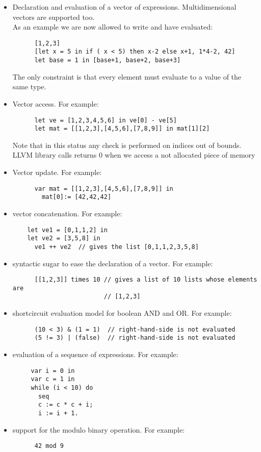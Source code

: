 \documentclass[11pt]{article}
\begin{document}
\begin{itemize}

  \item Declaration and evaluation of a vector of expressions. Multidimensional vectors are supported too.\\
  As an example we are now allowed to write and have evaluated:
  \begin{verbatim}
      [1,2,3]
      [let x = 5 in if ( x < 5) then x-2 else x+1, 1*4-2, 42]
      let base = 1 in [base+1, base+2, base+3]
  \end{verbatim}{}
  The only constraint is that every element must evaluate to a value of the same type.
  
  \item Vector access. For example:
  \begin{verbatim}
      let ve = [1,2,3,4,5,6] in ve[0] - ve[5]
      let mat = [[1,2,3],[4,5,6],[7,8,9]] in mat[1][2]
  \end{verbatim}{}
  Note that in this status any check is performed on indices out of bounds. LLVM library calls returns 0 when we access a not allocated piece of memory
  
  \item Vector update. For example:
  \begin{verbatim}
      var mat = [[1,2,3],[4,5,6],[7,8,9]] in
        mat[0]:= [42,42,42]
  \end{verbatim}{}
  
  \item vector concatenation. For example:
  \begin{verbatim}
    let ve1 = [0,1,1,2] in
    let ve2 = [3,5,8] in
      ve1 ++ ve2  // gives the list [0,1,1,2,3,5,8]
  \end{verbatim}{}
  
  \item syntactic sugar to ease the declaration of a vector. For example:
  \begin{verbatim}
      [[1,2,3]] times 10 // gives a list of 10 lists whose elements are
                         // [1,2,3]
  \end{verbatim}{}
  
  \item shortcircuit evaluation model for boolean AND and OR. For example:
  \begin{verbatim}
      (10 < 3) & (1 = 1)  // right-hand-side is not evaluated 
      (5 != 3) | (false)  // right-hand-side is not evaluated
  \end{verbatim}{}
  
  \item evaluation of a sequence of expressions. For example:
  \begin{verbatim}
     var i = 0 in
     var c = 1 in
     while (i < 10) do
       seq
       c := c * c + i;
       i := i + 1. 
  \end{verbatim}{}
  
  \item support for the modulo binary operation. For example:
  \begin{verbatim}
      42 mod 9
  \end{verbatim}{}
\end{itemize}
\end{document}
